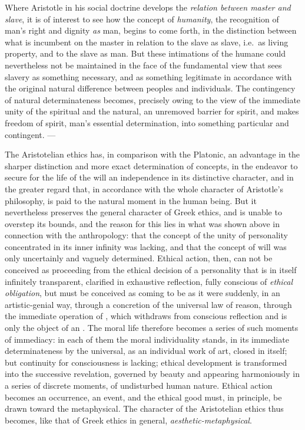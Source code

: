 Where Aristotle in his social doctrine develops the \emph{relation
between master and slave}, it is of interest to see how the concept of \emph{humanity}, the recognition of man's
right and dignity \emph{as} man, begins to come forth,
in the distinction between what is incumbent on the master in relation to
the slave as slave, i.e.\ as living property, and to the slave as
man. But these intimations of the humane could nevertheless
not be maintained in the face of the fundamental view that sees slavery as something necessary, and as something legitimate in accordance with the original natural difference between peoples and individuals.
The contingency of natural determinateness becomes, precisely owing to the view
of the immediate unity of the spiritual and the natural, an
unremoved barrier for spirit, and makes freedom of spirit, man's essential determination, into something particular and contingent. ---

The Aristotelian ethics has, in comparison with the
Platonic, an advantage in the sharper distinction and more exact determination of concepts, in the endeavor to secure for the life of the will
an independence in its distinctive character, and in the greater regard
that, in accordance with the whole character of Aristotle's philosophy,
is paid to the natural moment in the human being.
But it nevertheless preserves the general character of Greek ethics,
and is unable to overstep its bounds, and the reason
for this lies in what was shown above in connection with the anthropology: that the concept of the unity of personality concentrated in its inner infinity
was lacking, and that the concept of will was only
uncertainly and vaguely determined. Ethical action, then, can
not be conceived as proceeding from the ethical decision of a personality that is in itself infinitely transparent, clarified in exhaustive reflection, fully conscious of \emph{ethical obligation},
but must be conceived as coming to be as it were suddenly, in an artistic-genial way, through a concretion of the universal law of reason, through
the immediate operation of , which withdraws from conscious reflection and is only the object of an . The
moral life therefore becomes a series of such moments of immediacy: in each of them the moral individuality stands, in its immediate determinateness by the universal,
as an individual work of art, closed in itself; but continuity for consciousness is lacking; ethical development is transformed into the successive revelation, governed by beauty and appearing harmoniously in a series of
discrete moments, of undisturbed human nature. Ethical
action becomes an occurrence, an event, and the ethical
good must, in principle, be drawn toward the metaphysical.
The character of the Aristotelian ethics thus becomes, like
that of Greek ethics in general, \emph{aesthetic-metaphysical}.

